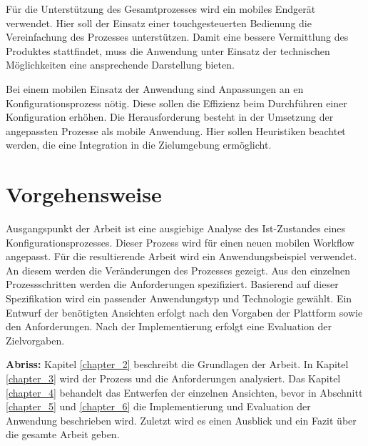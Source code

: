 Für die Unterstützung des Gesamtprozesses wird ein mobiles Endgerät verwendet. Hier soll der Einsatz einer touchgesteuerten Bedienung die Vereinfachung des Prozesses unterstützen. Damit eine bessere Vermittlung des Produktes stattfindet, muss die Anwendung unter Einsatz der technischen Möglichkeiten eine ansprechende Darstellung bieten. 

Bei einem mobilen Einsatz der Anwendung sind Anpassungen an en Konfigurationsprozess nötig. Diese sollen die Effizienz beim Durchführen einer Konfiguration erhöhen. Die Herausforderung besteht in der Umsetzung der angepassten Prozesse als mobile Anwendung. Hier sollen Heuristiken beachtet werden, die eine Integration in die Zielumgebung ermöglicht. 


\section{Vorgehensweise}
Ausgangspunkt der Arbeit ist eine ausgiebige Analyse des Ist-Zustandes eines Konfigurationsprozesses. Dieser Prozess wird für einen neuen mobilen Workflow angepasst. Für die resultierende Arbeit wird ein Anwendungsbeispiel verwendet. An diesem werden die Veränderungen des Prozesses gezeigt. Aus den einzelnen Prozessschritten werden die Anforderungen spezifiziert. Basierend auf dieser Spezifikation wird ein passender Anwendungstyp und Technologie gewählt. Ein Entwurf der benötigten Ansichten erfolgt nach den Vorgaben der Plattform sowie den Anforderungen. Nach der Implementierung erfolgt eine Evaluation der Zielvorgaben. 
\par
\textbf{Abriss: }
Kapitel \ref{chapter_2} beschreibt die Grundlagen der Arbeit. In Kapitel \ref{chapter_3} wird der Prozess und die Anforderungen analysiert. Das Kapitel \ref{chapter_4} behandelt das Entwerfen der einzelnen Ansichten, bevor in Abschnitt \ref{chapter_5} und \ref{chapter_6} die Implementierung und Evaluation der Anwendung beschrieben wird. Zuletzt wird es einen Ausblick und ein Fazit über die gesamte Arbeit geben.







